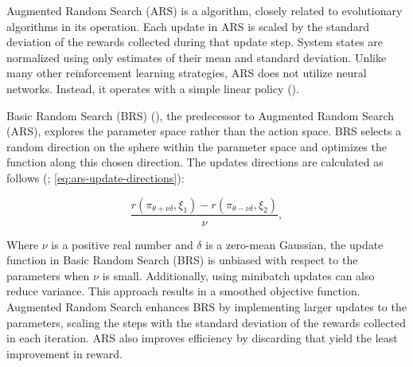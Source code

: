 \bigskip

\noindent Augmented Random Search (ARS) is a  algorithm, closely related to evolutionary algorithms in its operation. Each update in ARS is scaled by the standard deviation of the rewards collected during that update step. System states are normalized using only estimates of their mean and standard deviation. Unlike many other reinforcement learning strategies, ARS does not utilize neural networks. Instead, it operates with a simple linear policy (\textcolor{deepblue}{\cite{mania2018simple}}).

\bigskip

\noindent Basic Random Search (BRS) (\textcolor{deepblue}{\cite{mania2018simple}}), the predecessor to Augmented Random Search (ARS), explores the parameter space rather than the action space. BRS selects a random direction on the sphere within the parameter space and optimizes the function along this chosen direction. The updates directions are calculated as follows (\textcolor{deepblue}{\cite{mania2018simple}; \autoref{eq:ars-update-directions}}):

\begin{equation}
    \frac{r(\pi_{\theta+\nu\delta}, \xi_1) - r(\pi_{\theta-\nu\delta}, \xi_2)}{\nu},
    \label{eq:ars-update-directions}
\end{equation}

\noindent Where $\nu$ is a positive real number and $\delta$ is a zero-mean Gaussian, the update function in Basic Random Search (BRS) is unbiased with respect to the parameters when $\nu$ is small. Additionally, using minibatch updates can also reduce variance. This approach results in a smoothed objective function. Augmented Random Search enhances BRS by implementing larger updates to the parameters, scaling the steps with the standard deviation of the rewards collected in each iteration. ARS also improves efficiency by discarding  that yield the least improvement in reward.


